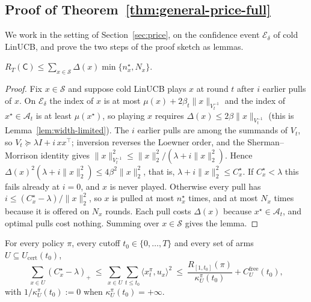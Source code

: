 \documentclass[anon]{alt2027} %
\newcommand{\Cold}{\mathsf{C}}
\begin{document}
\subsection{Proof of Theorem~\ref{thm:general-price-full}}
\label{app:proof-general-price}

We work in the setting of Section~\ref{sec:price}, on the confidence event
$\mathcal E_\delta$ of cold LinUCB, and prove the two steps of the proof
sketch as lemmas.

\begin{lemma}
\label{lem:cold-price}
$R_T(\Cold)\le\sum_{x\in\mathcal S}\Delta(x)\min\{n^\star_x,N_x\}$.
\end{lemma}

\begin{proof}
Fix $x\in \mathcal S$ and suppose cold LinUCB plays $x$ at round $t$ after
$i$ earlier pulls of $x$. On $\mathcal E_\delta$ the index of $x$ is at most
$\mu(x)+2\beta_t\|x\|_{V_t^{-1}}$ and the index of $x^\star\in\mathcal A_t$
is at least $\mu(x^\star)$, so playing $x$ requires
$\Delta(x)\le2\beta\|x\|_{V_t^{-1}}$ (this is Lemma~\ref{lem:width-limited}).
The $i$ earlier pulls are among the summands of $V_t$, so
$V_t\succeq\lambda I+i\,xx^\top$; inversion reverses the Loewner order, and
the Sherman--Morrison identity gives
$\|x\|^2_{V_t^{-1}}\le\|x\|_2^2/(\lambda+i\|x\|_2^2)$. Hence
$\Delta(x)^2(\lambda+i\|x\|_2^2)\le4\beta^2\|x\|_2^2$, that is,
$\lambda+i\|x\|_2^2\le C^\star_x$. If $C^\star_x<\lambda$ this fails already at $i=0$, and
$x$ is never played. Otherwise every pull has
$i\le(C^\star_x-\lambda)/\|x\|_2^2$, so $x$ is pulled at most $n^\star_x$ times, and at
most $N_x$ times because it is offered on $N_x$ rounds. Each pull costs
$\Delta(x)$ because $x^\star\in\mathcal A_t$, and optimal pulls cost nothing.
Summing over $x\in \mathcal S$ gives the lemma.
\end{proof}

\begin{lemma}
\label{lem:cert-cost}
For every policy $\pi$, every cutoff $t_0\in\{0,\dots,T\}$ and every set of
arms $U\subseteq U_{\mathrm{cert}}(t_0)$,
\[
\sum_{x\in U}(C^\star_x-\lambda)_+\ \le\ \sum_{x\in U}\sum_{t\le t_0}\langle x^\pi_t,u_x\rangle^2
\ \le\ \frac{R_{[1,t_0]}(\pi)}{\kappa^\pi_U(t_0)}+C^{\mathrm{free}}_U(t_0),
\]
with $1/\kappa^\pi_U(t_0):=0$ when $\kappa^\pi_U(t_0)=+\infty$.
\end{lemma}
\end{document}
